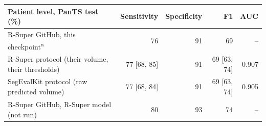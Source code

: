 \begin{tabular}{lrrrr}
\toprule
Patient level, PanTS test (\%) & Sensitivity & Specificity & F1 & AUC \\
\midrule
R-Super GitHub, this checkpoint\textsuperscript{a} & 76 & 91 & 69 & -- \\
R-Super protocol (their volume, their thresholds) & 77 {\scriptsize [68, 85]} & 91 & 69 {\scriptsize [63, 74]} & 0.907 \\
SegEvalKit protocol (raw predicted volume) & 77 {\scriptsize [68, 84]} & 91 & 69 {\scriptsize [63, 74]} & 0.905 \\
\textcolor{skmuted}{R-Super GitHub, R-Super model (not run)} & \textcolor{skmuted}{80} & \textcolor{skmuted}{93} & \textcolor{skmuted}{74} & -- \\
\bottomrule
\end{tabular}
